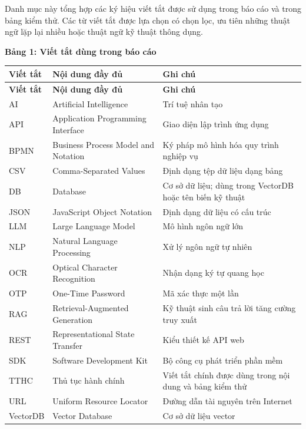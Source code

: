\noindent Danh mục này tổng hợp các ký hiệu viết tắt được sử dụng trong báo cáo và trong bảng kiểm thử. Các từ viết tắt được lựa chọn có chọn lọc, ưu tiên những thuật ngữ lặp lại nhiều hoặc thuật ngữ kỹ thuật thông dụng.

\vspace{0.5em}
\noindent\textbf{Bảng 1: Viết tắt dùng trong báo cáo}

\renewcommand{\arraystretch}{1.25}
\begin{longtable}{|>{\centering\arraybackslash}p{2.4cm}|p{5.2cm}|p{7.1cm}|}
\hline
\textbf{Viết tắt} & \textbf{Nội dung đầy đủ} & \textbf{Ghi chú} \\ \hline
\endfirsthead
\hline
\textbf{Viết tắt} & \textbf{Nội dung đầy đủ} & \textbf{Ghi chú} \\ \hline
\endhead
AI & Artificial Intelligence & Trí tuệ nhân tạo \\ \hline
API & Application Programming Interface & Giao diện lập trình ứng dụng \\ \hline
BPMN & Business Process Model and Notation & Ký pháp mô hình hóa quy trình nghiệp vụ \\ \hline
CSV & Comma-Separated Values & Định dạng tệp dữ liệu dạng bảng \\ \hline
DB & Database & Cơ sở dữ liệu; dùng trong VectorDB hoặc tên biến kỹ thuật \\ \hline
JSON & JavaScript Object Notation & Định dạng dữ liệu có cấu trúc \\ \hline
LLM & Large Language Model & Mô hình ngôn ngữ lớn \\ \hline
NLP & Natural Language Processing & Xử lý ngôn ngữ tự nhiên \\ \hline
OCR & Optical Character Recognition & Nhận dạng ký tự quang học \\ \hline
OTP & One-Time Password & Mã xác thực một lần \\ \hline
RAG & Retrieval-Augmented Generation & Kỹ thuật sinh câu trả lời tăng cường truy xuất \\ \hline
REST & Representational State Transfer & Kiểu thiết kế API web \\ \hline
SDK & Software Development Kit & Bộ công cụ phát triển phần mềm \\ \hline
TTHC & Thủ tục hành chính & Viết tắt chính được dùng trong nội dung và bảng kiểm thử \\ \hline
URL & Uniform Resource Locator & Đường dẫn tài nguyên trên Internet \\ \hline
VectorDB & Vector Database & Cơ sở dữ liệu vector \\ \hline
\end{longtable}

